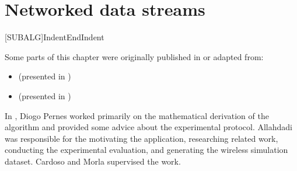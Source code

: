 
\chapter{Networked data streams}


\label{chp:networked_data_streams}


[SUBALG]{Indent}{EndIndent}{}{\algorithmicend\ }%

\begin{tcolorbox}
	\small{
		Some parts of this chapter were originally published in or adapted from:
		\begin{itemize}
			\item[] \cite{SOHMMM}  (presented in )
			\item[] \cite{SpaMHMM}  (presented in )
		\end{itemize}
		
		In \cite{SOHMMM}, Diogo Pernes worked primarily on the mathematical derivation of the algorithm and provided some advice about the experimental protocol. Allahdadi was responsible for the motivating the application, researching related work, conducting the experimental evaluation, and generating the wireless simulation dataset. Cardoso and Morla supervised the work.
	}
\end{tcolorbox}

